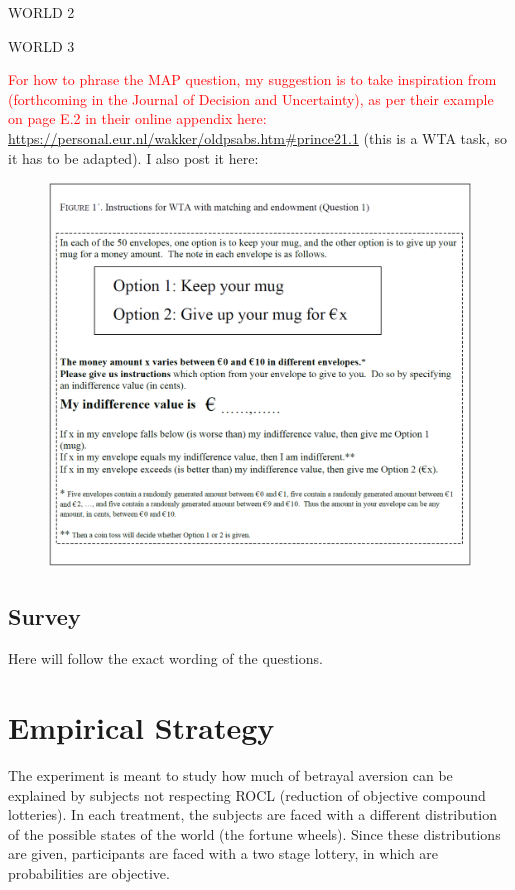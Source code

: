 WORLD 2

WORLD 3

\textcolor{red}{For how to phrase the MAP question, my suggestion is to take inspiration from} \cite{Johnson2019} \textcolor{red}{(forthcoming in the Journal of Decision and Uncertainty), as per their example on page E.2 in their online appendix here:} \url{https://personal.eur.nl/wakker/oldpsabs.htm#prince21.1} (this is a WTA task, so it has to be adapted).
I also post it here:

\begin{figure}[h!]
  \centering
 {\includegraphics[width=0.95\linewidth]{Wakker_image.pdf}}
  \label{fig:instr}
\end{figure}

\subsection{Survey}
Here will follow the exact wording of the questions.



\section{Empirical Strategy}
The experiment is meant to study how much of betrayal aversion can be explained by subjects not respecting ROCL (reduction of objective compound lotteries).
In each treatment, the subjects are faced with a different distribution of the possible states of the world (the fortune wheels).
Since these distributions are given, participants are faced with a two stage lottery, in which are probabilities are objective.

